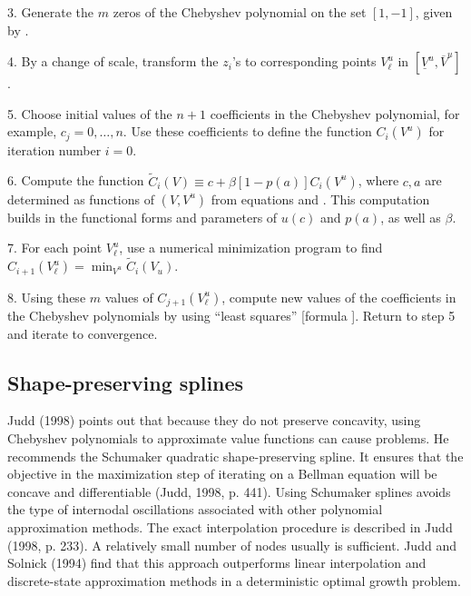 \item{3.}  Generate the $m$ zeros of the  Chebyshev polynomial
on the set $[1, -1]$, given by .

\item{4.} By a change of scale,  transform  the $z_i$'s to
corresponding points $V^u_\ell$ in $[\underline V^u, \overline V^u]$.

\item{5.} Choose initial values of the $n+1$ coefficients in
the Chebyshev polynomial, for example, $c_j =0, \ldots, n$.
 Use these coefficients to
define the function $C_i(V^u)$ for iteration number $i=0$.

\item{6.}   Compute the  function   $\tilde C_i(V)
\equiv c + \beta [1-p(a)] C_i(V^u)$, where
$c,a$ are determined as functions of $(V, V^u)$
 from equations  and .
This computation builds in the functional forms and parameters
of $u(c)$ and $p(a)$, as well as $\beta$.


\item{7.}  For each point $V^u_\ell$, use a numerical
minimization program to find
$C_{i+1}(V^u_\ell) =  \min_{V^u} \tilde C_i(V_u)$.

\item{8.}   Using these $m$ values of $C_{j+1}(V^u_\ell)$, compute
new values of the coefficients in the Chebyshev polynomials
by using ``least squares'' [formula ].
     Return to step 5 and iterate to convergence.

\subsection{Shape-preserving splines}
Judd (1998) points out that because they do not
preserve concavity,  using Chebyshev polynomials  to approximate
value functions can cause problems.
He recommends the Schumaker quadratic shape-preserving spline.  It ensures
%
that the objective in the maximization step  of iterating on
a Bellman equation  will be concave
and differentiable (Judd,  1998, p. 441).
Using Schumaker splines  avoids the type of internodal
oscillations associated with other polynomial approximation methods. The
exact interpolation procedure is described in Judd (1998, p. 233). A
relatively small number of  nodes usually is sufficient.
 Judd and
Solnick (1994) find that this approach outperforms  linear interpolation and
discrete-state approximation methods in a deterministic optimal growth
problem.
